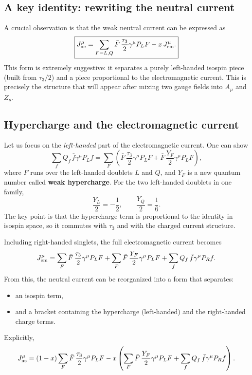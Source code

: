 \subsection{A key identity: rewriting the neutral current}
A crucial observation is that the weak neutral current can be expressed as
\begin{equation}
\boxed{
J^\mu_{\rm nc}=\sum_{F=L,Q}\bar F\,\frac{\tau_3}{2}\gamma^\mu P_LF
-x\,J^\mu_{\rm em}.
}
\label{eq:Jnc-T3-Jem}
\end{equation}
This form is extremely suggestive: it separates a purely left-handed isospin piece (built from $\tau_3/2$) and a piece proportional to the electromagnetic current. This is precisely the structure that will appear after mixing two gauge fields into $A_\mu$ and $Z_\mu$.

\subsection{Hypercharge and the electromagnetic current}
Let us focus on the \emph{left-handed} part of the electromagnetic current. One can show
\begin{equation}
\sum_f Q_f\,\bar f\gamma^\mu P_L f
=
\sum_F\left(
\bar F\,\frac{\tau_3}{2}\gamma^\mu P_LF
+\bar F\,\frac{Y_F}{2}\gamma^\mu P_LF
\right),
\end{equation}
where $F$ runs over the left-handed doublets $L$ and $Q$, and $Y_F$ is a new quantum number called \textbf{weak hypercharge}.
For the two left-handed doublets in one family,
\begin{equation}
\boxed{
\frac{Y_L}{2}=-\frac{1}{2},
\qquad
\frac{Y_Q}{2}=\frac{1}{6}.
}
\label{eq:YL-YQ}
\end{equation}
The key point is that the hypercharge term is proportional to the identity in isospin space, so it commutes with $\tau_3$ and with the charged current structure.

Including right-handed singlets, the full electromagnetic current becomes
\begin{equation}
J^\mu_{\rm em}
=
\sum_F \bar F\,\frac{\tau_3}{2}\gamma^\mu P_LF
+
\sum_F \bar F\,\frac{Y_F}{2}\gamma^\mu P_LF
+
\sum_f Q_f\,\bar f\gamma^\mu P_R f.
\end{equation}
From this, the neutral current can be reorganized into a form that separates:
\begin{itemize}
  \item an isospin term,
  \item and a bracket containing the hypercharge (left-handed) and the right-handed charge terms.
\end{itemize}
Explicitly,
\begin{equation}
J^\mu_{\rm nc}
=
(1-x)\sum_F \bar F\,\frac{\tau_3}{2}\gamma^\mu P_LF
-
x\left(
\sum_F \bar F\,\frac{Y_F}{2}\gamma^\mu P_LF
+
\sum_f Q_f\,\bar f\gamma^\mu P_R f
\right).
\end{equation}

